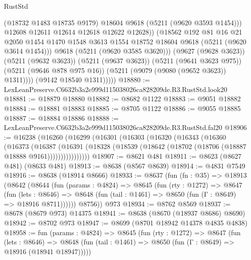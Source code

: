 \begin{lexlean}{RustStd}
\begin{coremodule}
                        (@18732 @1483 @18735 @9179)
                        @18604
                        @9618
                        (@5211 (@9620 @3593 @1454)))
                      @12608
                      @12611
                      @12614
                      @12618
                      @12622
                      @12628))
                  (@18562
                    @192
                    @81
                    @16
                    @21
                    @2050
                    @1454
                    @1470
                    @1548
                    @3613
                    @1554
                    @18752
                    @18604
                    @9618
                    (@5211 (@9620 @3614 @1454)))
                  @9618
                  (@5211 (@9620 @3585 @3620)))
                (@9627 (@9628 @3623))
                (@5211 (@9632 @3623))
                (@5211 (@9637 @3623))
                (@5211 (@9641 @3623 @975))
                (@5211 (@9646 @878 @975 @16))
                (@5211 (@9079 (@9080 (@9652 @3623)) @1311))))
            (@9142 @18540 @1311)))))
@18880 := LexLeanPreserve.C6632b3a2e999d115038026ca828209de.R3.RustStd.look20
@18881 := @18879 @18880
@18882 := @8682 @1122
@18883 := @9051 @18882
@18884 := @18881 @18883
@18885 := @8705 @1122
@18886 := @9055 @18885
@18887 := @18884 @18886
@18888 := LexLeanPreserve.C6632b3a2e999d115038026ca828209de.R3.RustStd.fal20
@18906 := @16238
    (@16260
      (@16299
        (@16301
          (@16303
            (@16320
              (@16343
                (@16360
                  (@16373
                    (@16387
                      (@16391
                        (@18328 (@18539 (@18642 (@18702 (@18706 (@18887 @18888 @9161))))))))))))))))
@18907 := @8621 @481
@18911 := @8623 (@8627 @481) (@8633 @481)
@18913 := @8638 (@8567 @8639)
@18914 := @4831 @7549
@18916 := @8638 (@18914 @8666)
@18933 := @8637
    (fun (fn : @35) =>
    @18913
      (@8642
        (@8644
          (fun (params : @4824) =>
          @8645
            (fun (rty : @1272) =>
            @8647
              (fun (lets : @8646) =>
              @8648 (fun (tail : @1461) => @8650 (fun (Γ : @8649) => @18916 @8711))))))
        @8756))
    @973
@18934 := @8762 @8569
@18937 := @8678 (@8679 @973) @14375
@18941 := @8638 (@8670 (@18937 @8686) @8690)
@18942 := @8702 @973
@18947 := @8699 (@8701 @18942 @14378 @4835 @4838)
@18958 := fun (params : @4824) =>
  @8645
    (fun (rty : @1272) =>
    @8647
      (fun (lets : @8646) =>
      @8648 (fun (tail : @1461) => @8650 (fun (Γ : @8649) => @18916 (@18941 @18947)))))

\end{coremodule}
\end{lexlean}
